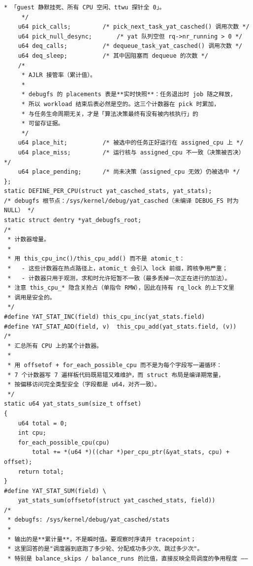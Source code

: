 \documentclass[10pt,a4paper]{article}
\newenvironment{yatpage}{\vspace*{0pt}}{\par}
\begin{document}
\newpage
\begin{yatpage}
\begin{Verbatim}[fontsize=\fontsize{8.2}{9.8}\selectfont]
	 * 「guest 静默挂死、所有 CPU 空闲、ttwu 探针全 0」。
	 */
	u64 pick_calls;			/* pick_next_task_yat_casched() 调用次数 */
	u64 pick_null_desync;		/* yat 队列空但 rq->nr_running > 0 */
	u64 deq_calls;			/* dequeue_task_yat_casched() 调用次数 */
	u64 deq_sleep;			/* 其中因阻塞而 dequeue 的次数 */
	/*
	 * AJLR 接管率（累计值）。
	 *
	 * debugfs 的 placements 表是**实时快照**：任务退出时 job 随之释放，
	 * 所以 workload 结束后表必然是空的。这三个计数器在 pick 时累加，
	 * 与任务生命周期无关，才是「算法决策最终有没有被内核执行」的
	 * 可留存证据。
	 */
	u64 place_hit;			/* 被选中的任务正好运行在 assigned_cpu 上 */
	u64 place_miss;			/* 运行核与 assigned_cpu 不一致（决策被否决） */
	u64 place_pending;		/* 尚未决策（assigned_cpu 无效）仍被选中 */
};
static DEFINE_PER_CPU(struct yat_casched_stats, yat_stats);
/* debugfs 根节点：/sys/kernel/debug/yat_casched（未编译 DEBUG_FS 时为 NULL） */
static struct dentry *yat_debugfs_root;
/*
 * 计数器增量。
 *
 * 用 this_cpu_inc()/this_cpu_add() 而不是 atomic_t：
 *   - 这些计数器在热点路径上，atomic_t 会引入 lock 前缀，跨核争用严重；
 *   - 计数器只用于观测，求和时允许短暂不一致（最多丢掉一次正在进行的加法）。
 * 注意 this_cpu_* 隐含关抢占（单指令 RMW），因此在持有 rq_lock 的上下文里
 * 调用是安全的。
 */
#define YAT_STAT_INC(field)	this_cpu_inc(yat_stats.field)
#define YAT_STAT_ADD(field, v)	this_cpu_add(yat_stats.field, (v))
/*
 * 汇总所有 CPU 上的某个计数器。
 *
 * 用 offsetof + for_each_possible_cpu 而不是为每个字段写一遍循环：
 * 7 个计数器写 7 遍样板代码既易错又难维护，而 struct 布局是编译期常量，
 * 按偏移访问完全类型安全（字段都是 u64，对齐一致）。
 */
static u64 yat_stats_sum(size_t offset)
{
	u64 total = 0;
	int cpu;
	for_each_possible_cpu(cpu)
		total += *(u64 *)((char *)per_cpu_ptr(&yat_stats, cpu) + offset);
	return total;
}
#define YAT_STAT_SUM(field)	\
	yat_stats_sum(offsetof(struct yat_casched_stats, field))
/*
 * debugfs: /sys/kernel/debug/yat_casched/stats
 *
 * 输出的是**累计量**，不是瞬时值。要观察时序请开 tracepoint；
 * 这里回答的是"调度器到底跑了多少轮、分配成功多少次、跳过多少次"。
 * 特别是 balance_skips / balance_runs 的比值，直接反映全局调度的争用程度 ——
\end{Verbatim}
\end{yatpage}
\newpage
\end{document}

